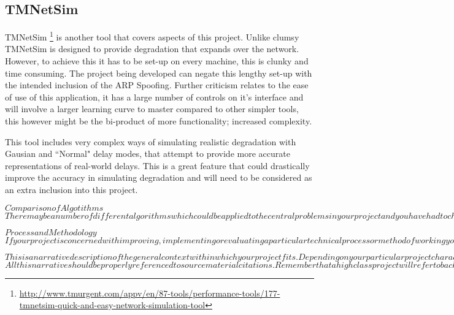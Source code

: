 \subsection{TMNetSim}
TMNetSim \footnote{\url{http://www.tmurgent.com/appv/en/87-tools/performance-tools/177-tmnetsim-quick-and-easy-network-simulation-tool}} is another tool that covers aspects of this project. Unlike clumsy TMNetSim is designed to provide degradation that expands over the network. However, to achieve this it has to be set-up on every machine, this is clunky and time consuming. The project being developed can negate this lengthy set-up with the intended inclusion of the ARP Spoofing. Further criticism relates to the ease of use of this application, it has a large number of controls on it's interface and will involve a larger learning curve to master compared to other simpler tools, this however might be the bi-product of more functionality; increased complexity.

This tool includes very complex ways of simulating realistic degradation with Gausian and ``Normal" delay modes, that attempt to provide more accurate representations of real-world delays. This is a great feature that could drastically improve the accuracy in simulating degradation and will need to be considered as an extra inclusion into this project.

$Comparison of Algotithms$
$There may be a number of different algorithms which could be applied to the central problems in your project and you have had to choose which of these algorithms are the most appropriate for your implementation. If this is the case then you should provide a comparative analysis and critical appraisal of each of the potentially applicable algorithms, highlighting their key features and their strengths and weaknesses in relation to your project.$

$Process and Methodology$
$If your project is concerned with improving, implementing or evaluating a particular technical process or method of working you should discuss these in detail. We are not expecting you to describe what software development methodology you are following in implementing your project and you certainly do not need to regurgitate textbook descriptions of the Waterfall method here as everyone already knows that model well.$

$This is a narrative description of the general context within which your project fits. Depending on your particular project characteristics, you are required to include discussion of any or all of the following – previous related work; the work or objectives of a client; the essential principles of systems or techniques you are using.$
$All this narrative should be properly referenced to source material citations. Remember that a high class project will refer to background sources beyond just those on the Web. $

